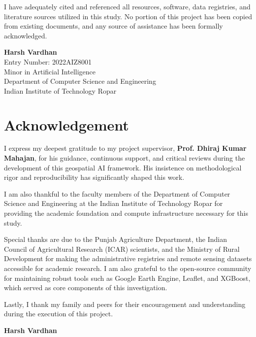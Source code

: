 \documentclass[12pt,a4paper]{report}
\begin{document}
I have adequately cited and referenced all resources, software, data registries, and literature sources utilized in this study. No portion of this project has been copied from existing documents, and any source of assistance has been formally acknowledged.

\vspace{2.5cm}

\noindent
\textbf{Harsh Vardhan} \\
Entry Number: 2022AIZ8001 \\
Minor in Artificial Intelligence \\
Department of Computer Science and Engineering \\
Indian Institute of Technology Ropar

\chapter*{Acknowledgement}
I express my deepest gratitude to my project supervisor, \textbf{Prof. Dhiraj Kumar Mahajan}, for his guidance, continuous support, and critical reviews during the development of this geospatial AI framework. His insistence on methodological rigor and reproducibility has significantly shaped this work.

I am also thankful to the faculty members of the Department of Computer Science and Engineering at the Indian Institute of Technology Ropar for providing the academic foundation and compute infrastructure necessary for this study. 

Special thanks are due to the Punjab Agriculture Department, the Indian Council of Agricultural Research (ICAR) scientists, and the Ministry of Rural Development for making the administrative registries and remote sensing datasets accessible for academic research. I am also grateful to the open-source community for maintaining robust tools such as Google Earth Engine, Leaflet, and XGBoost, which served as core components of this investigation.

Lastly, I thank my family and peers for their encouragement and understanding during the execution of this project.

\vspace{1.5cm}
\noindent
\textbf{Harsh Vardhan}

\end{document}

